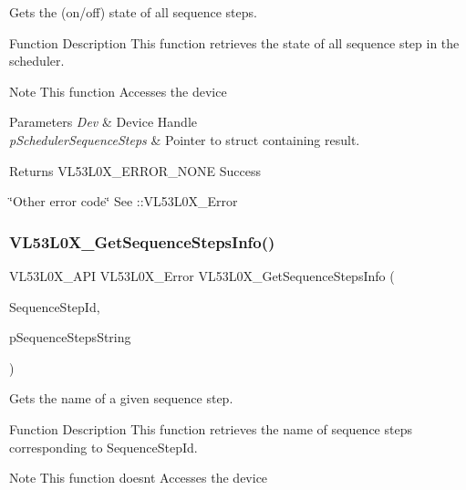 Gets the (on/off) state of all sequence steps. 

\begin{DoxyParagraph}{Function Description}
This function retrieves the state of all sequence step in the scheduler.
\end{DoxyParagraph}
\begin{DoxyNote}{Note}
This function Accesses the device
\end{DoxyNote}

\begin{DoxyParams}{Parameters}
{\em Dev} & Device Handle \\
\hline
{\em p\+Scheduler\+Sequence\+Steps} & Pointer to struct containing result. \\
\hline
\end{DoxyParams}
\begin{DoxyReturn}{Returns}
V\+L53\+L0\+X\+\_\+\+E\+R\+R\+O\+R\+\_\+\+N\+O\+NE Success 

\char`\"{}\+Other error code\char`\"{} See \+::\+V\+L53\+L0\+X\+\_\+\+Error 
\end{DoxyReturn}
\mbox{\label{group__VL53L0X__parameters__group_ga42e44b3fe3ea7f999fd7da3b94aa023e}} 
\subsubsection{\texorpdfstring{V\+L53\+L0\+X\+\_\+\+Get\+Sequence\+Steps\+Info()}{VL53L0X\_GetSequenceStepsInfo()}}
{\footnotesize\ttfamily V\+L53\+L0\+X\+\_\+\+A\+PI V\+L53\+L0\+X\+\_\+\+Error V\+L53\+L0\+X\+\_\+\+Get\+Sequence\+Steps\+Info (\begin{DoxyParamCaption}\item[{V\+L53\+L0\+X\+\_\+\+Sequence\+Step\+Id}]{Sequence\+Step\+Id,  }\item[{char $\ast$}]{p\+Sequence\+Steps\+String }\end{DoxyParamCaption})}



Gets the name of a given sequence step. 

\begin{DoxyParagraph}{Function Description}
This function retrieves the name of sequence steps corresponding to Sequence\+Step\+Id.
\end{DoxyParagraph}
\begin{DoxyNote}{Note}
This function doesn\textquotesingle{}t Accesses the device
\end{DoxyNote}


